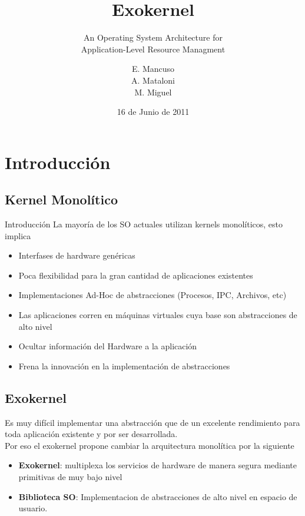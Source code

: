 \documentclass[10pt]{beamer}
\title{Exokernel}
\subtitle{An Operating System Architecture for \\  Application-Level Resource Managment}
\author{E. Mancuso\\ A. Mataloni\\ M. Miguel }
\date{16 de Junio de 2011}
\begin{document}
 \begin{frame}
  \titlepage
 \end{frame}
 \begin{frame}
  \tableofcontents
 \end{frame}
\section{Introducción}
\subsection{Kernel Monolítico}
\begin{frame}{Introducción}
La mayoría de los SO actuales utilizan kernels monolíticos, esto implica

\begin{itemize}
  \item Interfases de hardware genéricas
  \item Poca flexibilidad para la gran cantidad de aplicaciones existentes
  \item Implementaciones Ad-Hoc de abstracciones (Procesos, IPC, Archivos, etc)
  \item Las aplicaciones corren en máquinas virtuales cuya base son abstracciones de alto nivel
  \item Ocultar información del Hardware a la aplicación
  \item Frena la innovación en la implementación de abstracciones
\end{itemize}
\end{frame}

\subsection{Exokernel}
\begin{frame}

Es muy difícil implementar una abstracción que de un excelente rendimiento para toda aplicación existente y por ser desarrollada.\\[1em]

Por eso el exokernel propone cambiar la arquitectura monolítica por la siguiente \\[1em]

\begin{itemize}
  \item \textbf{Exokernel}: multiplexa los servicios de hardware de manera segura mediante primitivas de muy bajo nivel
  \item \textbf{Biblioteca SO}: Implementacion de abstracciones de alto nivel en espacio de usuario.
\end{itemize}
\end{frame}
\end{document}
